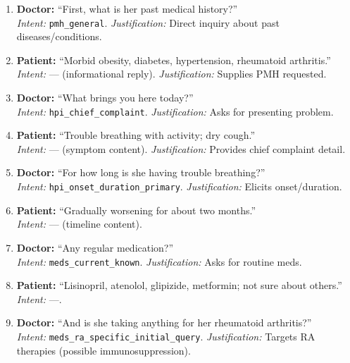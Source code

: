 \begin{enumerate}
  \item \textbf{Doctor:} ``First, what is her past medical history?'' \\
  \emph{Intent:} \texttt{pmh\_general}. \emph{Justification:} Direct inquiry about past diseases/conditions.

  \item \textbf{Patient:} ``Morbid obesity, diabetes, hypertension, rheumatoid arthritis.'' \\
  \emph{Intent:} --- (informational reply). \emph{Justification:} Supplies PMH requested.

  \item \textbf{Doctor:} ``What brings you here today?'' \\
  \emph{Intent:} \texttt{hpi\_chief\_complaint}. \emph{Justification:} Asks for presenting problem.

  \item \textbf{Patient:} ``Trouble breathing with activity; dry cough.'' \\
  \emph{Intent:} --- (symptom content). \emph{Justification:} Provides chief complaint detail.

  \item \textbf{Doctor:} ``For how long is she having trouble breathing?'' \\
  \emph{Intent:} \texttt{hpi\_onset\_duration\_primary}. \emph{Justification:} Elicits onset/duration.

  \item \textbf{Patient:} ``Gradually worsening for about two months.'' \\
  \emph{Intent:} --- (timeline content).

  \item \textbf{Doctor:} ``Any regular medication?'' \\
  \emph{Intent:} \texttt{meds\_current\_known}. \emph{Justification:} Asks for routine meds.

  \item \textbf{Patient:} ``Lisinopril, atenolol, glipizide, metformin; not sure about others.'' \\
  \emph{Intent:} ---.

  \item \textbf{Doctor:} ``And is she taking anything for her rheumatoid arthritis?'' \\
  \emph{Intent:} \texttt{meds\_ra\_specific\_initial\_query}. \emph{Justification:} Targets RA therapies (possible immunosuppression).


\end{enumerate}
